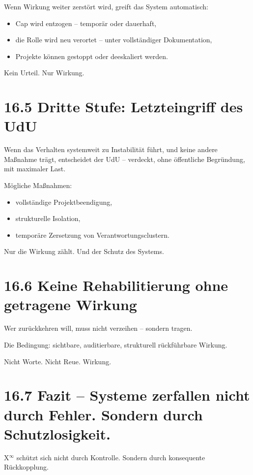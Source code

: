 \documentclass[12pt,a4paper]{book}
\begin{document}
Wenn Wirkung weiter zerstört wird,  
greift das System automatisch:

\begin{itemize}
    \item Cap wird entzogen – temporär oder dauerhaft,
    \item die Rolle wird neu verortet – unter vollständiger Dokumentation,
    \item Projekte können gestoppt oder deeskaliert werden.
\end{itemize}

Kein Urteil. Nur Wirkung.

\section*{16.5 Dritte Stufe: Letzteingriff des UdU}

Wenn das Verhalten systemweit zu Instabilität führt,  
und keine andere Maßnahme trägt,  
entscheidet der UdU – verdeckt, ohne öffentliche Begründung, mit maximaler Last.

Mögliche Maßnahmen:

\begin{itemize}
    \item vollständige Projektbeendigung,
    \item strukturelle Isolation,
    \item temporäre Zersetzung von Verantwortungsclustern.
\end{itemize}

Nur die Wirkung zählt.  
Und der Schutz des Systems.

\section*{16.6 Keine Rehabilitierung ohne getragene Wirkung}

Wer zurückkehren will,  
muss nicht verzeihen – sondern tragen.

Die Bedingung:  
sichtbare, auditierbare, strukturell rückführbare Wirkung.

Nicht Worte. Nicht Reue. Wirkung.

\section*{16.7 Fazit – Systeme zerfallen nicht durch Fehler. Sondern durch Schutzlosigkeit.}

X$^\infty$ schützt sich nicht durch Kontrolle.  
Sondern durch konsequente Rückkopplung.
\end{document}
